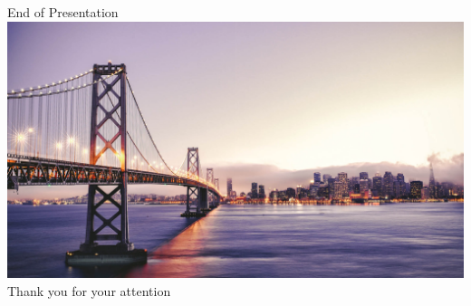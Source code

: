 \documentclass[11pt]{beamer}
\begin{document}
\begin{frame}{End of Presentation}
\vfill
\centering
\includegraphics[width=\textwidth]{San-Francisco}
Thank you for your attention
\vfill
\end{frame}
\end{document}
